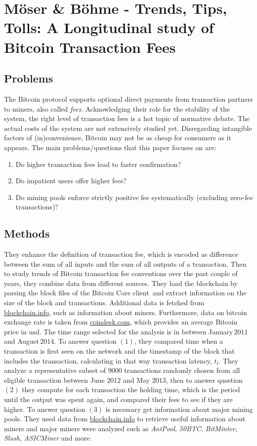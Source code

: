 \section{Möser \& Böhme - Trends, Tips, Tolls: A Longitudinal
study of Bitcoin Transaction Fees}
\label{sec:moser}
\subsection{Problems}
The Bitcoin protocol supports optional direct payments
from transaction partners to miners, also called \emph{fees}.
Acknowledging their
role for the stability of the system, the right level of
transaction fees is a hot topic of normative debate. The actual
costs of the system are not extensively studied yet. Disregarding
intangible factors of (in)convenience, Bitcoin may not be as cheap for
consumers as it appears. The main problems/questions
that this paper focuses on are:
\begin{enumerate}[noitemsep]
	\item Do higher transaction fees lead to faster confirmation?
	\item Do impatient users offer higher fees?
	\item Do mining pools enforce strictly positive fee systematically
	(excluding zero-fee transactions)?
\end{enumerate}

\subsection{Methods}
They enhance the definition of transaction fee, which is encoded
as difference between the sum of all inputs and the sum of all outputs
of a transaction. Then to study trends of Bitcoin transaction fee
conventions over the past couple of years, they combine data from
different sources. They load the blockchain by parsing
the block files of the Bitcoin Core client\,\cite{bitcoincore}
and extract information on the size of the block and transactions.
Additional data is fetched from \url{blockchain.info}, such as
information about miners. Furthermore, data on bitcoin exchange rate
is taken from \url{coindesk.com}, which provides an average Bitcoin
price in \gls{usd}. The time range selected for the analysis
is in between January\,$2011$ and August\,$2014$. To answer
question $(1)$, they compared time when a transaction is first
seen on the network and the timestamp of the block that includes
the transaction, calculating in that way transaction latency, $t_l$.
They analyze a representative subset of $9000$ transactions
randomly chosen from all eligible transaction between June
$2012$ and May $2013$, then to answer question $(2)$ they
compute for each transaction the holding time, which is the period
until the output was spent again, and compared their fees to see if
they are higher. To answer question $(3)$ is necessary get
information about major mining pools. They used data
from \url{blockchain.info} to retrieve useful information about miners
and major miners were analyzed such as \emph{AntPool}, \emph{50BTC},
\emph{BitMinter}, \emph{Slush}, \emph{ASICMiner} and more.
